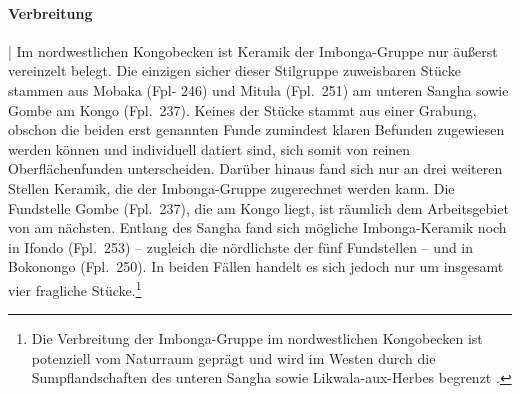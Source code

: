 \paragraph{Verbreitung}\hspace{-.5em}|\hspace{.5em}%
Im nordwestlichen Kongobecken ist Keramik der Imbonga-Gruppe nur äußerst vereinzelt belegt. Die einzigen sicher dieser Stilgruppe zuweisbaren Stücke stammen aus Mobaka (Fpl- 246) und Mitula (Fpl.~251) am unteren \mbox{Sangha} sowie Gombe am Kongo (Fpl.~237). Keines der Stücke stammt aus einer Grabung, obschon die beiden erst genannten Funde zumindest klaren Befunden zugewiesen werden können und individuell datiert sind, sich somit von reinen Oberflächenfunden unterscheiden. Darüber hinaus fand sich nur an drei weiteren Stellen Keramik, die der Imbonga-Gruppe zugerechnet werden kann. Die Fundstelle Gombe (Fpl.~237), die am Kongo liegt, ist räumlich dem Arbeitsgebiet von \textcite{Wotzka.1995} am nächsten. Entlang des \mbox{Sangha} fand sich mögliche Imbonga-Keramik noch in Ifondo (Fpl.~253) -- zugleich die nördlichste der fünf Fundstellen -- und in Bokonongo (Fpl.~250). In beiden Fällen handelt es sich jedoch nur um insgesamt vier fragliche Stücke.\footnote{Die Verbreitung der Imbonga-Gruppe im nordwestlichen Kongobecken ist potenziell vom Naturraum geprägt und wird im Westen durch die Sumpflandschaften des unteren \mbox{Sangha} sowie \mbox{Likwala}-\mbox{aux}-\mbox{Herbes} begrenzt \parencite[siehe][350 Karte 19.1]{Gregoire.2003}.}